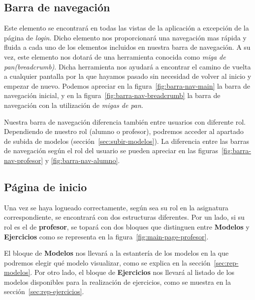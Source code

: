 \subsection{Barra de navegación}\label{sec:barra-navegacion}
Este elemento se encontrará en todas las vistas de la aplicación a excepción de la página de \textit{login}. Dicho elemento nos proporcionará una navegación mas rápida y fluida a cada uno de los elementos incluidos en nuestra barra de navegación. A su vez, este elemento nos dotará de una herramienta conocida como \textit{miga de pan(breadcrumb)}. Dicha herramienta nos ayudará a encontrar el camino de vuelta a cualquier pantalla por la que hayamos pasado sin necesidad de volver al inicio y empezar de nuevo. Podemos apreciar en la figura~\ref{fig:barra-nav-main} la barra de navegación inicial, y en la figura~\ref{fig:barra-nav-breadcrumb} la barra de navegación con la utilización de \textit{migas de pan}.

Nuestra barra de navegación diferencia también entre usuarios con diferente rol. Dependiendo de nuestro rol (alumno o profesor), podremos acceder al apartado de subida de modelos (sección~\ref{sec:subir-modelos}). La diferencia entre las barras de navegación según el rol del usuario se pueden apreciar en las figuras~\ref{fig:barra-nav-profesor} y \ref{fig:barra-nav-alumno}.

\subsection{Página de inicio}
Una vez se haya logueado correctamente, según sea su rol en la asignatura correspondiente, se encontrará con dos estructuras diferentes.
Por un lado, si su rol es el de \textbf{profesor}, se topará con dos bloques que distinguen entre \textbf{Modelos} y \textbf{Ejercicios} como se representa en la figura~\ref{fig:main-page-profesor}.

El bloque de \textbf{Modelos} nos llevará a la estantería de los modelos en la que podremos elegir qué modelo visualizar, como se explica en la sección~\ref{sec:rep-modelos}. Por otro lado, el bloque de \textbf{Ejercicios} nos llevará al listado de los modelos disponibles para la realización de ejercicios, como se muestra en la sección~\ref{sec:rep-ejercicios}.

